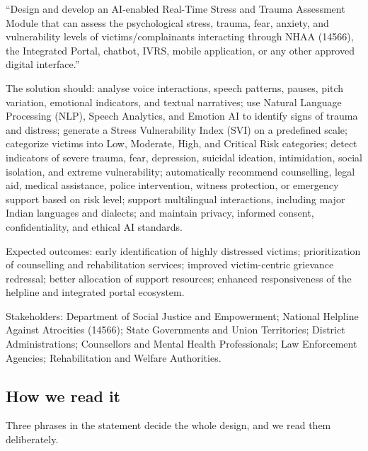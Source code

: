 \documentclass[11pt,a4paper]{article}
\begin{document}
\begin{quotebox}[title={Problem statement and expected solution, as issued}]
\small
``Design and develop an AI-enabled Real-Time Stress and Trauma Assessment Module that can assess the
psychological stress, trauma, fear, anxiety, and vulnerability levels of victims/complainants
interacting through NHAA (14566), the Integrated Portal, chatbot, IVRS, mobile application, or any
other approved digital interface.''

\smallskip
The solution should: analyse voice interactions, speech patterns, pauses, pitch variation, emotional
indicators, and textual narratives; use Natural Language Processing (NLP), Speech Analytics, and
Emotion AI to identify signs of trauma and distress; generate a Stress Vulnerability Index (SVI) on
a predefined scale; categorize victims into Low, Moderate, High, and Critical Risk categories;
detect indicators of severe trauma, fear, depression, suicidal ideation, intimidation, social
isolation, and extreme vulnerability; automatically recommend counselling, legal aid, medical
assistance, police intervention, witness protection, or emergency support based on risk level;
support multilingual interactions, including major Indian languages and dialects; and maintain
privacy, informed consent, confidentiality, and ethical AI standards.

\smallskip
Expected outcomes: early identification of highly distressed victims; prioritization of counselling
and rehabilitation services; improved victim-centric grievance redressal; better allocation of
support resources; enhanced responsiveness of the helpline and integrated portal ecosystem.

\smallskip
Stakeholders: Department of Social Justice and Empowerment; National Helpline Against Atrocities
(14566); State Governments and Union Territories; District Administrations; Counsellors and Mental
Health Professionals; Law Enforcement Agencies; Rehabilitation and Welfare Authorities.
\end{quotebox}

\subsection{How we read it}
Three phrases in the statement decide the whole design, and we read them deliberately.
\end{document}
